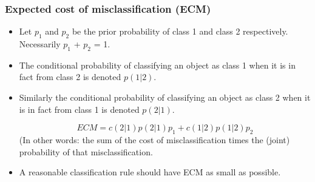 \documentclass[PredictiveAnalytics101.tex]{subfiles}
\begin{document}
\begin{frame}
\frametitle{Expected cost of misclassification (ECM)}
\begin{itemize}
\item Let $p_1$ and $p_2$ be the prior probability of class 1 and class 2 respectively.
Necessarily $p_1$ + $p_2$ = 1.

\item The conditional probability of classifying an object as class 1 when it is in fact from
class 2 is denoted $p(1|2)$.
\item Similarly the conditional probability of classifying an object as class 2 when it is in
fact from class 1 is denoted $p(2|1)$.

\[ECM = c(2|1)p(2|1)p_1 + c(1|2)p(1|2)p_2\]
(In other words: the sum of the cost of misclassification times the (joint) probability of that misclassification.

\item A reasonable classification rule should have ECM as small as possible.
\end{itemize}
\end{frame}
\end{document}
